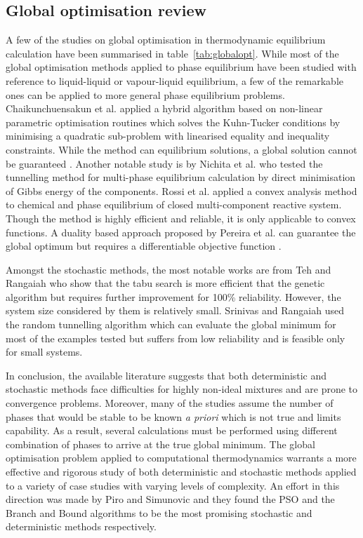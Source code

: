 	\subsection{Global optimisation review}
	 A few of the studies on global optimisation in thermodynamic equilibrium calculation have been summarised in table~\ref{tab:globalopt}. While most of the global optimisation methods applied to phase equilibrium have been studied with reference to liquid-liquid or vapour-liquid equilibrium, a few of the remarkable ones can be applied to more general phase equilibrium problems. Chaikunchuensakun et al. \cite{Chaikunchuensakun:2002aa} applied a hybrid algorithm based on non-linear parametric optimisation routines which solves the Kuhn-Tucker conditions by minimising a quadratic sub-problem with linearised equality and inequality constraints. While the method can equilibrium solutions, a global solution cannot be guaranteed \cite{Zhang11}. Another notable study is by Nichita et al. \cite{Nichita02} who tested the tunnelling method for multi-phase equilibrium calculation by direct minimisation of Gibbs energy of the components. Rossi et al. \cite{ROSSI20111226} applied a convex analysis method to chemical and phase equilibrium of closed multi-component reactive system. Though the method is highly efficient and reliable, it is only applicable to convex functions. A duality based approach proposed by Pereira et al. \cite{PEREIRA20101} can guarantee the global optimum but requires a differentiable objective function \cite{Zhang11}.

	 Amongst the stochastic methods, the most notable works are from Teh and Rangaiah \cite{Teh03} who show that the tabu search is more efficient that the genetic algorithm but requires further improvement for 100\% reliability. However, the system size considered by them is relatively small. Srinivas and Rangaiah \cite{Srinivas06} used the random tunnelling algorithm which can evaluate the global minimum for most of the examples tested but suffers from low reliability and is feasible only for small systems.

	 In conclusion, the available literature suggests that both deterministic and stochastic methods face difficulties for highly non-ideal mixtures and are prone to convergence problems. Moreover, many of the studies assume the number of phases that would be stable to be known \textit{a priori} which is not true and limits capability. As a result, several calculations must be performed using different combination of phases to arrive at the true global minimum. The global optimisation problem applied to computational thermodynamics warrants a more effective and rigorous study of both deterministic and stochastic methods applied to a variety of case studies with varying levels of complexity. An effort in this direction was made by Piro and Simunovic \cite{Piro16} and they found the PSO and the Branch and Bound algorithms to be the most promising stochastic and deterministic methods respectively.

